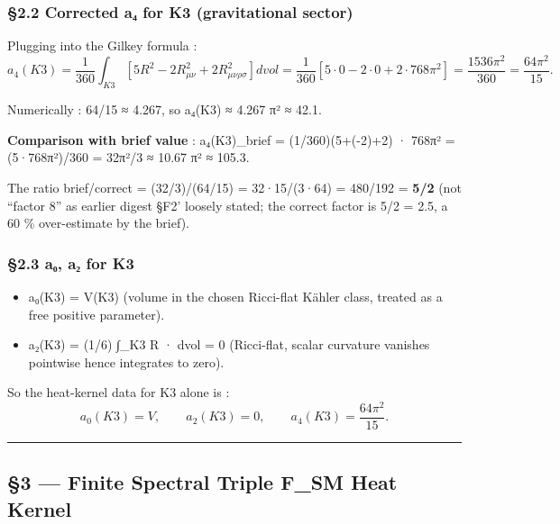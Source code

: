 \documentclass[
  11pt,
  a4paper,
]{article}
\providecommand{\tightlist}{\setlength{\itemsep}{0pt}\setlength{\parskip}{0pt}}
\providecommand{\tightlist}{%
  \setlength{\itemsep}{0pt}\setlength{\parskip}{0pt}}
\begin{document}
\hypertarget{corrected-aux2084-for-k3-gravitational-sector}{%
\subsubsection{§2.2 Corrected a₄ for K3 (gravitational sector)}\label{corrected-aux2084-for-k3-gravitational-sector}}

Plugging into the Gilkey formula :
\[
a_4(K3) = \frac{1}{360} \int_{K3} \left[ 5 R^2 - 2 R_{\mu\nu}^2 + 2 R_{\mu\nu\rho\sigma}^2 \right] dvol
= \frac{1}{360} \left[ 5 \cdot 0 - 2 \cdot 0 + 2 \cdot 768\pi^2 \right]
= \frac{1536 \pi^2}{360} = \boxed{\frac{64 \pi^2}{15}}.
\]

Numerically : 64/15 ≈ 4.267, so a₄(K3) ≈ 4.267 π² ≈ 42.1.

\textbf{Comparison with brief value} : a₄(K3)\_brief = (1/360)(5+(-2)+2) · 768π² = (5·768π²)/360 = 32π²/3 ≈ 10.67 π² ≈ 105.3.

The ratio brief/correct = (32/3)/(64/15) = 32·15/(3·64) = 480/192 = \textbf{5/2} (not ``factor 8'' as earlier digest §F2' loosely stated; the correct factor is 5/2 = 2.5, a 60 \% over-estimate by the brief).

\hypertarget{aux2080-aux2082-for-k3}{%
\subsubsection{§2.3 a₀, a₂ for K3}\label{aux2080-aux2082-for-k3}}

\begin{itemize}
\tightlist
\item
  a₀(K3) = V(K3) (volume in the chosen Ricci-flat Kähler class, treated as a free positive parameter).
\item
  a₂(K3) = (1/6) ∫\_K3 R · dvol = 0 (Ricci-flat, scalar curvature vanishes pointwise hence integrates to zero).
\end{itemize}

So the heat-kernel data for K3 alone is :
\[
a_0(K3) = V, \qquad a_2(K3) = 0, \qquad a_4(K3) = \frac{64\pi^2}{15}.
\]

\begin{center}\rule{0.5\linewidth}{0.5pt}\end{center}

\hypertarget{finite-spectral-triple-f_sm-heat-kernel}{%
\subsection{§3 --- Finite Spectral Triple F\_SM Heat Kernel}\label{finite-spectral-triple-f_sm-heat-kernel}}
\end{document}
